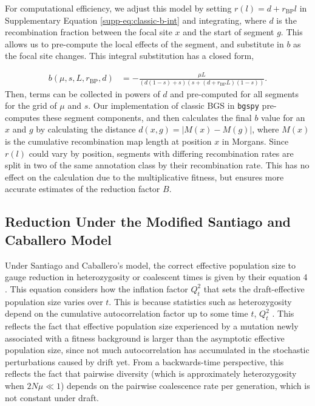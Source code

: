 \documentclass[11pt]{article}
\begin{document}
For computational efficiency, we adjust this model by setting $r(l) = d +
r_\text{BP} l$ in Supplementary Equation \eqref{supp-eq:classic-b-int} and
integrating, where $d$ is the recombination fraction between the focal site $x$
and the start of segment $g$. This allows us to pre-compute the local effects
of the segment, and substitute in $b$ as the focal site changes. This integral
substitution has a closed form,

\begin{align}
  b(\mu, s, L, r_\text{BP}, d) &= - \frac{\mu L}{(d(1-s) + s)(s + (d + r_\text{BP}L)(1-s))}.
\end{align}
%
Then, terms can be collected in powers of $d$ and pre-computed for all segments for
the grid of $\mu$ and $s$. Our implementation of classic BGS in \texttt{bgspy}
pre-computes these segment components, and then calculates the final $b$ value
for an $x$ and $g$ by calculating the distance $d(x,g) = |M(x) - M(g)|$, where
$M(x)$ is the cumulative recombination map length at position $x$ in Morgans.
Since $r(l)$ could vary by position, segments with differing recombination
rates are split in two of the same annotation class by their recombination
rate. This has no effect on the calculation due to the multiplicative fitness,
but ensures more accurate estimates of the reduction factor $B$.


\subsection{Reduction Under the Modified Santiago and Caballero Model}
\label{supp:reduction-sc16}

Under Santiago and Caballero's model, the correct effective population size to
gauge reduction in heterozygosity or coalescent times is given by their
equation 4 \parencite{Santiago2016-mu}. This equation considers how the
inflation factor $Q_t^2$ that sets the draft-effective population size varies
over $t$. This is because statistics such as heterozygosity depend on the
cumulative autocorrelation factor up to some time $t$, $Q_t^2$ \parencite[p.
2111]{Santiago1998-bs}. This reflects the fact that effective population size
experienced by a mutation newly associated with a fitness background is larger
than the asymptotic effective population size, since not much autocorrelation
has accumulated in the stochastic perturbations caused by drift yet. From a
backwards-time perspective, this reflects the fact that pairwise diversity
(which is approximately heterozygosity when $2N\mu \ll 1$) depends on the
pairwise coalescence rate per generation, which is not constant under draft. 
\end{document}
